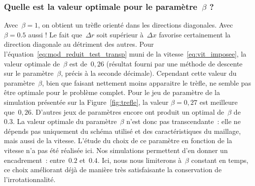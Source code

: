 \documentclass[main.tex]{subfiles}
\begin{document}
\subsubsection{
Quelle est la valeur optimale pour le paramètre~$\beta$ ?} 
Avec~$\beta=1$, on obtient un trèfle orienté dans les directions diagonales. 
Avec~$\beta=0.5$ aussi ! Le fait que~$\Delta r$ soit supérieur à~$\Delta x$ favorise certainement la direction diagonale au détriment des autres. 
Pour l'équation~\eqref{eq:mod_reduit_test_transp} muni de la vitesse~\eqref{eq:vit_imposee}, la valeur optimale de~$\beta$ est de~$0,26$ (résultat fourni par une méthode de descente sur le paramètre~$\beta$, précis à la seconde décimale). 
Cependant cette valeur du paramètre~$\beta$, bien que faisant nettement moins apparaitre le trèfle, ne semble pas être optimale pour le problème complet. Pour le jeu de paramètre de la simulation présentée sur la Figure~\ref{fig:trefle}, la valeur $\beta=0,27$ est meilleure que~$0,26$. D'autres jeux de paramètres encore ont produit un optimal de~$\beta$ de~$0.3$. 
La valeur optimale du paramètre~$\beta$ n'est donc pas transcendante~: elle ne dépends pas uniquement du schéma utilisé et des caractéristiques du maillage, mais aussi de la vitesse. L'étude du choix de ce paramètre en fonction de la vitesse n'a pas été réalisée ici. Nos simulations permettent d'en donner un encadrement~: entre~$0.2$ et~$0.4$. Ici, nous nous limiterons à~$\beta$ constant en temps, ce choix améliorant déjà de manière très satisfaisante la conservation de l'irrotationnalité.
\end{document}
